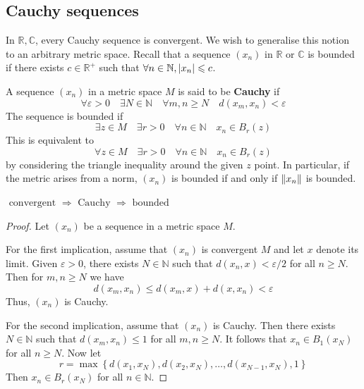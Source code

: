 \documentclass[a4paper,11pt]{article}
\begin{document}
\subsection{Cauchy sequences}
In \( \mathbb R, \mathbb C \), every Cauchy sequence is convergent.
We wish to generalise this notion to an arbitrary metric space.
Recall that a sequence \( (x_n) \) in \( \mathbb R \) or \( \mathbb C \) is bounded if there exists \( c \in \mathbb R^+ \) such that \( \forall n \in \mathbb N, \abs{x_n} \leqslant c \).
\begin{definition}
	A sequence \( (x_n) \) in a metric space \( M \) is said to be \textbf{Cauchy} if
	\[
		\forall \varepsilon > 0\quad \exists N \in \mathbb N\quad \forall m,n \geq N\quad d(x_m,x_n) < \varepsilon
	\]
	The sequence is bounded if
	\[
		\exists z \in M\quad \exists r > 0\quad \forall n \in \mathbb N\quad x_n \in B_r(z)
	\]
	This is equivalent to
	\[
		\forall z \in M\quad \exists r > 0\quad \forall n \in \mathbb N\quad x_n \in B_r(z)
	\]
	by considering the triangle inequality around the given \( z \) point.
	In particular, if the metric arises from a norm, \( (x_n) \) is bounded if and only if \( \norm{x_n} \) is bounded.
\end{definition}
\begin{lemma}
	$ \text { convergent } \Longrightarrow \text { Cauchy } \Longrightarrow \text { bounded } $
\end{lemma}

\begin{proof}
    Let $\left(x_n\right)$ be a sequence in a metric space $M$.

    For the first implication, assume that $\left(x_n\right)$ is convergent $M$ and let $x$ denote its limit. Given $\varepsilon>0$, there exists $N \in \mathbb{N}$ such that $d\left(x_n, x\right)<\varepsilon / 2$ for all $n \geqslant N$. Then for $m, n \geqslant N$ we have
    \[
    d\left(x_m, x_n\right) \leqslant d\left(x_m, x\right)+d\left(x, x_n\right)<\varepsilon
    \]
    Thus, $\left(x_n\right)$ is Cauchy.

    For the second implication, assume that $\left(x_n\right)$ is Cauchy. Then there exists $N \in \mathbb{N}$ such that $d\left(x_m, x_n\right) \leqslant 1$ for all $m, n \geqslant N$. It follows that $x_n \in B_1\left(x_N\right)$ for all $n \geqslant N$. Now let
    \[
    r=\max \left\{d\left(x_1, x_N\right), d\left(x_2, x_N\right), \ldots, d\left(x_{N-1}, x_N\right), 1\right\}
    \]
    Then $x_n \in B_r\left(x_N\right)$ for all $n \in \mathbb{N}$.
\end{proof}
\end{document}
